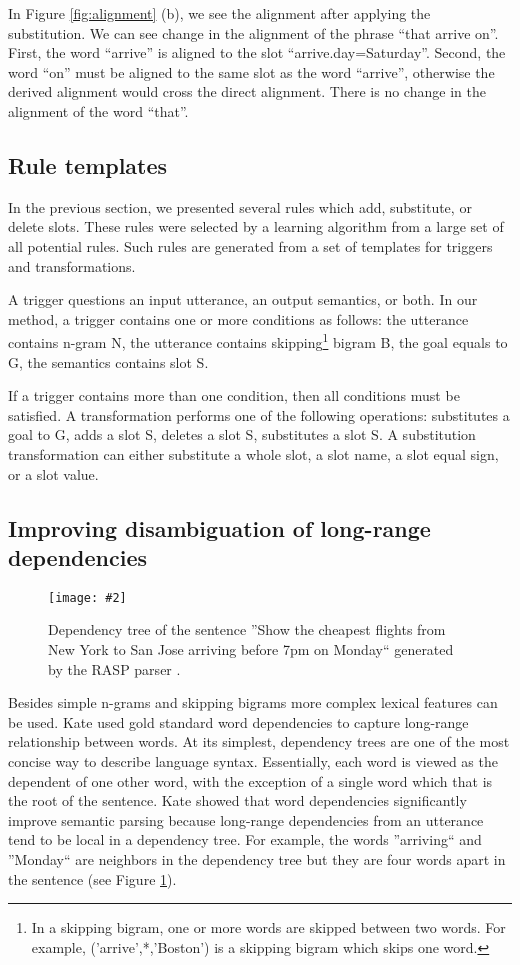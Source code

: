 \documentclass{article}
\newcommand{\citep}[1]{\cite{#1}}
\newcommand{\fgrparam}[4]{
  \begin{figure}[htbp]
    \begin{center}
      \leavevmode
      \texttt{[image: \#2]}
    \end{center}
    \vspace{-0.5cm}
    \caption{#4}
    \label{#3}
  \end{figure}
}
\begin{document}
In Figure \ref{fig:alignment} (b), we see the alignment after applying the substitution. We can see change in the alignment of the phrase ``that arrive on''. First, the word ``arrive'' is aligned to the slot ``arrive.day=Saturday''. Second, the word ``on'' must be aligned to the same slot as the word ``arrive'',  otherwise the derived alignment would cross the direct alignment. There is no change in the alignment of the word ``that''.

\subsection{Rule templates}
In the previous section, we presented several rules which add, substitute, or delete slots. These rules were selected by a learning algorithm from a large set of all potential rules. Such rules are generated from a set of templates for triggers and transformations. 

A trigger 
questions an input utterance, an output semantics, or both. In our method, a trigger contains one or more conditions as follows: the utterance contains n-gram N, the utterance contains skipping\footnote{In a skipping bigram, one or more words are skipped between two words. For example, ('arrive',*,'Boston') is a skipping bigram which skips one word.} bigram B, the goal equals to G, the semantics contains slot S.

If a trigger contains more than one condition, then all conditions must be satisfied. A transformation performs one of the following operations: substitutes a goal to G, adds a slot S, deletes a slot S, substitutes a slot S. A substitution transformation can either substitute a whole slot, a slot name, a slot equal sign, or a slot value.

\subsection{Improving disambiguation of long-range dependencies}
\label{sec:dep:trees}

\fgrparam{width=5.5cm}{./fig/dep-tree.pdf}{fig:dep:tree}{Dependency tree of the sentence ''Show the cheapest flights from New York to San Jose arriving before 7pm on Monday`` generated by the RASP parser \cite{rasp06}.}

Besides simple n-grams and skipping bigrams more complex lexical features can be used. Kate \citep{kate08} used gold standard word dependencies to capture long-range relationship between words. At its simplest, dependency trees are one of the most concise way to describe language syntax. Essentially, each word is viewed as the dependent of one other word, with the exception of a single word which that is the root of the sentence. Kate showed that word dependencies significantly improve semantic parsing because long-range dependencies from an utterance tend to be local in a dependency tree. For example, the words ''arriving`` and ''Monday`` are neighbors in the dependency tree but they are four words apart in the sentence (see Figure \ref{fig:dep:tree}).
\end{document}
